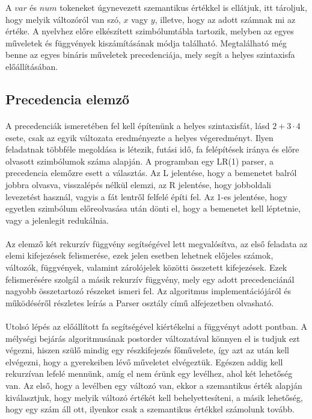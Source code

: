\documentclass[12pt]{report}
\begin{document}
A $var$ és $num$ tokeneket úgynevezett szemantikus értékkel is ellátjuk, itt tároljuk, hogy melyik változóról van szó, $x$ vagy $y$, illetve, hogy az adott számnak mi az értéke. A nyelvhez előre elkészített szimbólumtábla tartozik, melyben az egyes műveletek és függvények kiszámításának módja található. Megtalálható még benne az egyes bináris műveletek precedenciája, mely segít a helyes szintaxisfa előállításában.
\subsection{Precedencia elemző}
\paragraph{}
A precedenciák ismeretében fel kell építenünk a helyes szintaxisfát, lásd $2+3\cdot4$ esete, csak az egyik változata eredményezte a helyes végeredményt. Ilyen feladatnak többféle megoldása is létezik, futási idő, fa felépítések iránya és előre olvasott szimbólumok száma alapján. A programban egy LR(1) parser, a precedencia elemőzre esett a választás. Az L jelentése, hogy a bemenetet balról jobbra olvasva, visszalépés nélkül elemzi, az R jelentése, hogy jobboldali levezetést használ, vagyis a fát lentről felfelé építi fel. Az 1-es jelentése, hogy egyetlen szimbólum előreolvasása után dönti el, hogy a bemenetet kell léptetnie, vagy a jelenlegit redukálnia.
\paragraph{}
Az elemző két rekurzív függvény segítségével lett megvalósítva, az első feladata az elemi kifejezések felismerése, ezek jelen esetben lehetnek előjeles számok, változók, függvények, valamint zárolójelek közötti összetett kifejezések. Ezek felismerésére szolgál a másik rekurzív függvény, mely egy adott precedenciánál nagyobb összetartozó részeket ismeri fel. Az algoritmus implementációjáról és működéséről részletes leírás a Parser osztály című alfejezetben olvasható.
\paragraph{}
Utolsó lépés az előállított fa segítségével kiértékelni a függvényt adott pontban. A mélységi bejárás algoritmusának postorder változatával könnyen el is tudjuk ezt végezni, hiszen szülő mindig egy részkifejezés főművelete, így azt az után kell elvégezni, hogy a gyerekeiben lévő műveletet elvégeztük. Egészen addig kell rekurzívan lefelé mennünk, amíg el nem érünk egy levélhez, ahol két lehetőség van. Az első, hogy a levélben egy változó van, ekkor a szemantikus érték alapján kiválasztjuk, hogy melyik változó értékét kell behelyettesíteni, a másik lehetőség, hogy egy szám áll ott, ilyenkor csak a szemantikus értékkel számolunk tovább.
\end{document}
